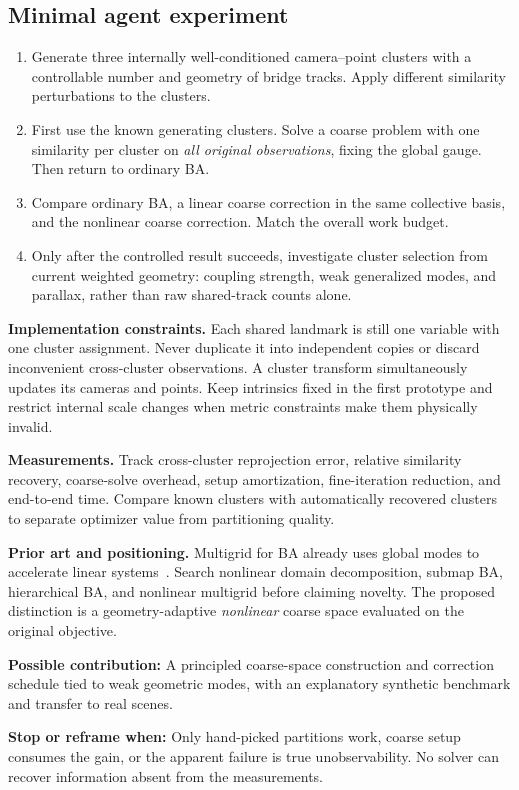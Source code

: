 \documentclass[11pt,a4paper]{article}
\newcommand{\stoprule}[1]{\par\textbf{Stop or reframe when:} #1\par}
\newcommand{\novelty}[1]{\par\textbf{Possible contribution:} #1\par}
\begin{document}
\subsection*{Minimal agent experiment}
\begin{enumerate}
\item Generate three internally well-conditioned camera--point clusters with a controllable number and geometry of bridge tracks. Apply different similarity perturbations to the clusters.
\item First use the known generating clusters. Solve a coarse problem with one similarity per cluster on \emph{all original observations}, fixing the global gauge. Then return to ordinary BA.
\item Compare ordinary BA, a linear coarse correction in the same collective basis, and the nonlinear coarse correction. Match the overall work budget.
\item Only after the controlled result succeeds, investigate cluster selection from current weighted geometry: coupling strength, weak generalized modes, and parallax, rather than raw shared-track counts alone.
\end{enumerate}

\textbf{Implementation constraints.} Each shared landmark is still one variable with one cluster assignment. Never duplicate it into independent copies or discard inconvenient cross-cluster observations. A cluster transform simultaneously updates its cameras and points. Keep intrinsics fixed in the first prototype and restrict internal scale changes when metric constraints make them physically invalid.

\textbf{Measurements.} Track cross-cluster reprojection error, relative similarity recovery, coarse-solve overhead, setup amortization, fine-iteration reduction, and end-to-end time. Compare known clusters with automatically recovered clusters to separate optimizer value from partitioning quality.

\textbf{Prior art and positioning.} Multigrid for BA already uses global modes to accelerate linear systems~\cite{multigrid}. Search nonlinear domain decomposition, submap BA, hierarchical BA, and nonlinear multigrid before claiming novelty. The proposed distinction is a geometry-adaptive \emph{nonlinear} coarse space evaluated on the original objective.

\novelty{A principled coarse-space construction and correction schedule tied to weak geometric modes, with an explanatory synthetic benchmark and transfer to real scenes.}
\stoprule{Only hand-picked partitions work, coarse setup consumes the gain, or the apparent failure is true unobservability. No solver can recover information absent from the measurements.}
\end{document}
